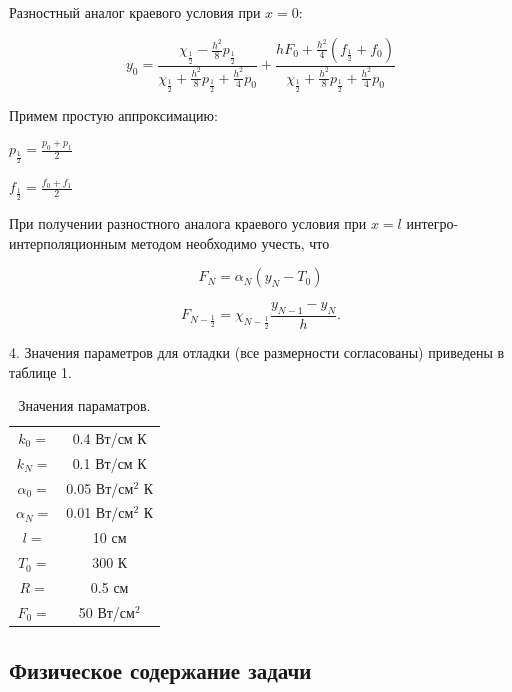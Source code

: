 \documentclass[a4paper,14pt]{article}
\begin{document}
Разностный аналог краевого условия при $x = 0$:

\begin{equation}
	y_0 = \frac{\chi_{\frac{1}{2}} - \frac{h^2}{8}p_{\frac{1}{2}}}{\chi_{\frac{1}{2}} + \frac{h^2}{8}p_{\frac{1}{2}} + \frac{h^2}{4}p_0} + \frac{h F_0 + \frac{h^2}{4} \left( f_{\frac{1}{2}} + f_0 \right)}{\chi_{\frac{1}{2}} + \frac{h^2}{8}p_{\frac{1}{2}} + \frac{h^2}{4}p_0}
\end{equation}

Примем простую аппроксимацию:

$p_{\frac{1}{2}} = \frac{p_0 + p_1}{2}$

$f_{\frac{1}{2}} = \frac{f_0 + f_1}{2}$

При получении разностного аналога краевого условия при 
$x = l$ интегро-интерполяционным методом необходимо учесть, что

\begin{equation}
	F_N = \alpha_N \left( y_N - T_0 \right)
\end{equation}

\begin{equation}
	F_{N-\frac{1}{2}} = \chi_{N-\frac{1}{2}}\frac{y_{N-1} - y_N}{h}.
\end{equation}



4. Значения параметров для отладки (все размерности согласованы) приведены в таблице 1.

\begin{table}[!h]
\caption{\label{tab.canonsummary} Значения параматров.}
\begin{center}
\begin{tabular}{|c c|}
\hline
$k_0 = $ & 0.4 Вт/см К \\
$k_N = $ & 0.1 Вт/см К \\
$\alpha_0 = $ & 0.05 Вт/см$^2$ К \\
$\alpha_N = $ & 0.01 Вт/см$^2$ К \\
$l = $ & 10 см \\
$T_0 = $ & 300 К \\
$R = $ & 0.5 см \\
$F_0 = $ & 50 Вт/см$^2$ \\
\hline
\end{tabular}
\end{center}
\end{table} 

\subsection*{Физическое содержание задачи}
\end{document}
